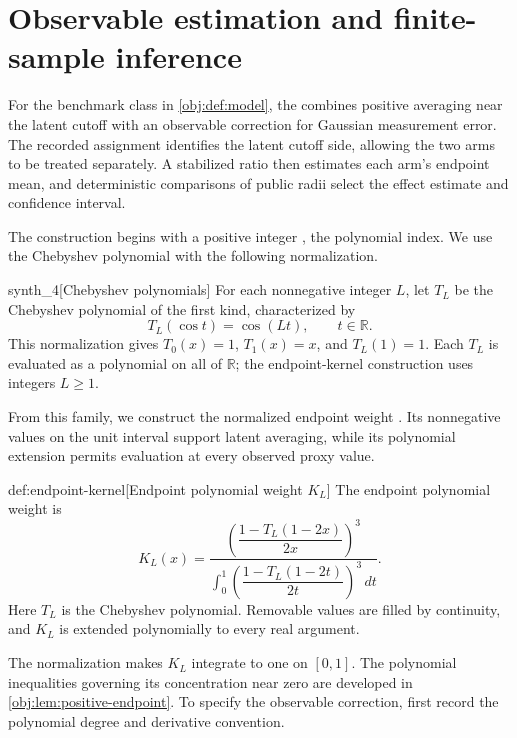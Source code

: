 \section{Observable estimation and finite-sample inference}

For the benchmark class in \cref{obj:def:model}, the  combines positive averaging near the latent cutoff with an observable correction for Gaussian measurement error. The recorded assignment identifies the latent cutoff side, allowing the two arms to be treated separately. A stabilized ratio then estimates each arm's endpoint mean, and deterministic comparisons of public radii select the effect estimate and confidence interval.

The construction begins with a positive integer , the polynomial index. We use the Chebyshev polynomial  with the following normalization.

\begin{definitionv}{synth_4}[Chebyshev polynomials]
For each nonnegative integer \(L\), let \(T_L\) be the Chebyshev polynomial of the first kind, characterized by
\[
T_L(\cos t)=\cos(Lt),
\qquad t\in\mathbb R.
\]
This normalization gives \(T_0(x)=1\), \(T_1(x)=x\), and \(T_L(1)=1\). Each \(T_L\) is evaluated as a polynomial on all of \(\mathbb R\); the endpoint-kernel construction uses integers \(L\ge1\).
\end{definitionv}

From this family, we construct the normalized endpoint weight . Its nonnegative values on the unit interval support latent averaging, while its polynomial extension permits evaluation at every observed proxy value.

\begin{definitionv}{def:endpoint-kernel}[Endpoint polynomial weight $K_L$]
The endpoint polynomial weight is
\[
K_L(x)
=
\frac{
\left(\dfrac{1-T_L(1-2x)}{2x}\right)^3
}{
\displaystyle\int_0^1
\left(\dfrac{1-T_L(1-2t)}{2t}\right)^3\,dt
}.
\]
Here \(T_L\) is the Chebyshev polynomial. Removable values are filled by continuity, and \(K_L\) is extended polynomially to every real argument.
\end{definitionv}

The normalization makes \(K_L\) integrate to one on \([0,1]\). The polynomial inequalities governing its concentration near zero are developed in \cref{obj:lem:positive-endpoint}. To specify the observable correction, first record the polynomial degree  and derivative convention.



